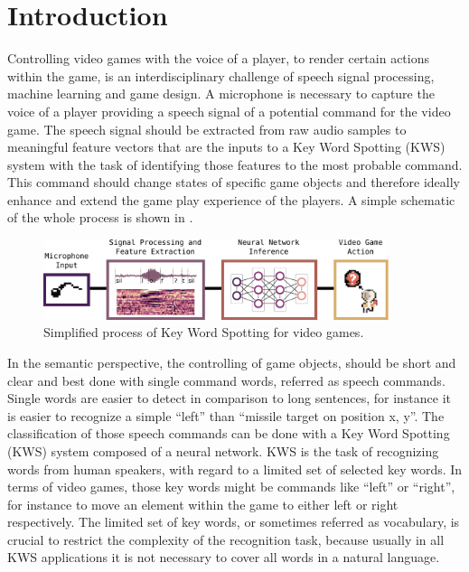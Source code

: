 
\chapter{Introduction}\label{sec:intro}
\thesisStateReady
Controlling video games with the voice of a player, to render certain actions within the game, is an interdisciplinary challenge of speech signal processing, machine learning and game design.
A microphone is necessary to capture the voice of a player providing a speech signal of a potential command for the video game.
The speech signal should be extracted from raw audio samples to meaningful feature vectors that are the inputs to a Key Word Spotting (KWS) system with the task of identifying those features to the most probable command.
This command should change states of specific game objects and therefore ideally enhance and extend the game play experience of the players.
A simple schematic of the whole process is shown in .
\begin{figure}[!ht]
  \centering
    \includegraphics[width=0.9\textwidth]{./1_intro/figs/intro_kws}
  \caption{Simplified process of Key Word Spotting for video games.}
  \label{fig:intro_kws}
\end{figure}
\FloatBarrier
\noindent
In the semantic perspective, the controlling of game objects, should be short and clear and best done with single command words, referred as speech commands.
Single words are easier to detect in comparison to long sentences, for instance it is easier to recognize a simple \enquote{left} than \enquote{missile target on position x, y}.
The classification of those speech commands can be done with a Key Word Spotting (KWS) system composed of a neural network.
KWS is the task of recognizing words from human speakers, with regard to a limited set of selected key words.
In terms of video games, those key words might be commands like \enquote{left} or \enquote{right}, for instance to move an element within the game to either left or right respectively.
The limited set of key words, or sometimes referred as vocabulary, is crucial to restrict the complexity of the recognition task, because usually in all KWS applications it is not necessary to cover all words in a natural language.

